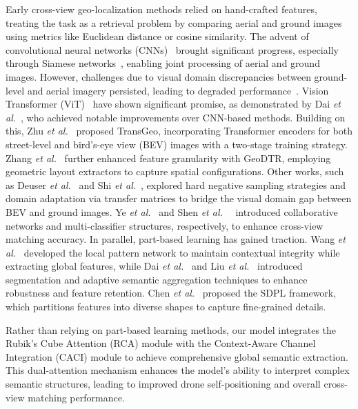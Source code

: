 Early cross-view geo-localization methods relied on hand-crafted features, treating the task as a retrieval problem by comparing aerial and ground images using metrics like Euclidean distance or cosine similarity. The advent of convolutional neural networks (CNNs)~\cite{krizhevsky2012imagenet, lecun1998gradient} brought significant progress, especially through Siamese networks~\cite{bromley1993signature, hadsell2006dimensionality}, enabling joint processing of aerial and ground images.
However, challenges due to visual domain discrepancies between ground-level and aerial imagery persisted, leading to degraded performance~\cite{hu2018cvm}.
Vision Transformer (ViT)~\cite{dosovitskiy2020image} have shown significant promise, as demonstrated by Dai \textit{et al.}~\cite{dai2021transformer}, who achieved notable improvements over CNN-based methods. Building on this, Zhu \textit{et al.}~\cite{zhu2022transgeo} proposed TransGeo, incorporating Transformer encoders for both street-level and bird's-eye view (BEV) images with a two-stage training strategy. Zhang \textit{et al.}~\cite{zhang2023cross} further enhanced feature granularity with GeoDTR, employing geometric layout extractors to capture spatial configurations. Other works, such as Deuser \textit{et al.}~\cite{deuser2023sample4geo} and Shi \textit{et al.}~\cite{shi2022cvlnet}, explored hard negative sampling strategies and domain adaptation via transfer matrices to bridge the visual domain gap between BEV and ground images. Ye \textit{et al.}~\cite{ye2024sg} and Shen \textit{et al.}~~\cite{10185134} introduced collaborative networks and multi-classifier structures, respectively, to enhance cross-view matching accuracy.
In parallel, part-based learning has gained traction. Wang \textit{et al.}~\cite{wang2021each} developed the local pattern network to maintain contextual integrity while extracting global features, while Dai \textit{et al.}~\cite{dai2021transformer} and Liu \textit{et al.}~\cite{liu2024adaptive} introduced segmentation and adaptive semantic aggregation techniques to enhance robustness and feature retention. Chen \textit{et al.}~\cite{chen2024sdpl} proposed the SDPL framework, which partitions features into diverse shapes to capture fine-grained details.

Rather than relying on part-based learning methods, our model integrates the Rubik's Cube Attention (RCA) module with the Context-Aware Channel Integration (CACI) module to achieve comprehensive global semantic extraction.
This dual-attention mechanism enhances the model's ability to interpret complex semantic structures, leading to improved drone self-positioning and overall cross-view matching performance.


